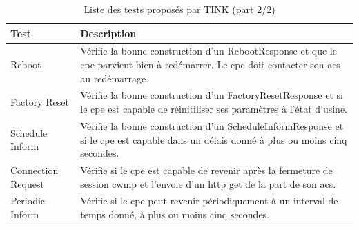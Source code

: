 \documentclass[12pt,a4paper]{report}
\begin{document}
\begin{appendix}
\begin{table}
	\begin{tabularx}{17cm}{|l|X|}
		\hline
		Test & Description\tabularnewline
		\hline
		Reboot & Vérifie la bonne construction d'un RebootResponse et que le \gls{cpe} parvient bien à redémarrer. Le \gls{cpe} doit contacter son \gls{acs} au redémarrage.\tabularnewline
		\hline
		Factory Reset & Vérifie la bonne construction d'un FactoryResetResponse et si le \gls{cpe} est capable de réinitiliser ses paramètres à l'état d'usine. \tabularnewline
		\hline
		Schedule Inform & Vérifie la bonne construction d'un ScheduleInformResponse et si le \gls{cpe} est capable dans un délais donné à plus ou moins cinq secondes. \tabularnewline
		\hline
		Connection Request & Vérifie si le \gls{cpe} est capable de revenir après la fermeture de session \gls{cwmp} et l'envoie d'un \gls{http} get de la part de son \gls{acs}. \tabularnewline
		\hline
		Periodic Inform & Vérifie si le \gls{cpe} peut revenir périodiquement à un interval de temps donné, à plus ou moins cinq secondes. \tabularnewline
		\hline
	\end{tabularx}
	\centering
	\caption{Liste des tests proposés par TINK (part 2/2)}
\end{table}



\end{appendix}
\end{document}
